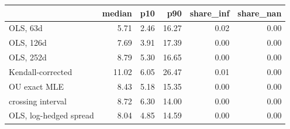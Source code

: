 \begin{tabular}{lrrrrr}
\toprule
 & median & p10 & p90 & share_inf & share_nan \\
\midrule
OLS, 63d & 5.71 & 2.46 & 16.27 & 0.02 & 0.00 \\
OLS, 126d & 7.69 & 3.91 & 17.39 & 0.00 & 0.00 \\
OLS, 252d & 8.79 & 5.30 & 16.65 & 0.00 & 0.00 \\
Kendall-corrected & 11.02 & 6.05 & 26.47 & 0.01 & 0.00 \\
OU exact MLE & 8.43 & 5.18 & 15.35 & 0.00 & 0.00 \\
crossing interval & 8.72 & 6.30 & 14.00 & 0.00 & 0.00 \\
OLS, log-hedged spread & 8.04 & 4.85 & 14.59 & 0.00 & 0.00 \\
\bottomrule
\end{tabular}
